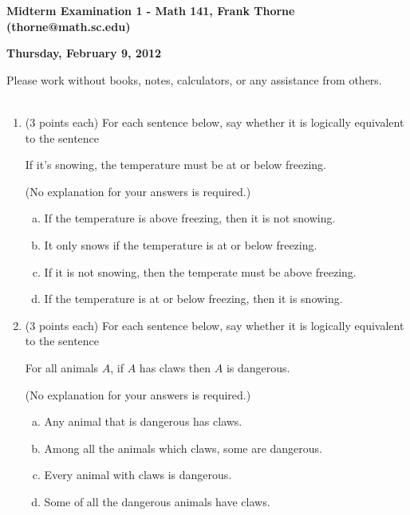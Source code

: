 \documentclass[12pt]{article}
\begin{document}
\setlength{\topmargin}{-12mm}






\begin{center}{\bf Midterm Examination 1 - Math 141, Frank Thorne (thorne@math.sc.edu)}
\end{center}
\begin{center}
{\bf Thursday, February 9, 2012}
\end{center}

Please work without books, notes, calculators, or any assistance from others.
\\
\\
\begin{enumerate}[1.]
\item(3 points each)
For each sentence below, say whether it is logically equivalent to the sentence
\begin{center}
If it's snowing, the temperature must be at or below freezing.
\end{center}
(No explanation for your answers is required.)
\begin{enumerate}[(a)]
\item
If the temperature is above freezing, then it is not snowing.
\item
It only snows if the temperature is at or below freezing.
\item
If it is not snowing, then the temperate must be above freezing.
\item
If the temperature is at or below freezing, then it is snowing.
\end{enumerate}
\vskip 0.2in
\item(3 points each)
For each sentence below, say whether it is logically equivalent to the sentence
\begin{center}
For all animals $A$, if $A$ has claws then $A$ is dangerous.
\end{center}
(No explanation for your answers is required.)
\begin{enumerate}[(a)]
\item
Any animal that is dangerous has claws.
\item
Among all the animals which claws, some are dangerous.
\item
Every animal with claws is dangerous.
\item
Some of all the dangerous animals have claws.
\end{enumerate}

\end{enumerate}
\end{document}
